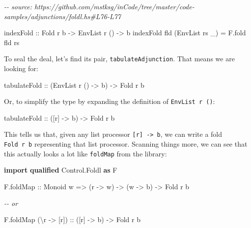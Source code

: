 \documentclass[]{article}
\newenvironment{Shaded}{}{}
\newcommand{\CommentTok}[1]{\textcolor[rgb]{0.38,0.63,0.69}{\textit{#1}}}
\newcommand{\DataTypeTok}[1]{\textcolor[rgb]{0.56,0.13,0.00}{#1}}
\newcommand{\KeywordTok}[1]{\textcolor[rgb]{0.00,0.44,0.13}{\textbf{#1}}}
\newcommand{\NormalTok}[1]{#1}
\newcommand{\OtherTok}[1]{\textcolor[rgb]{0.00,0.44,0.13}{#1}}
\begin{document}
\begin{Shaded}
\begin{Highlighting}[]
\CommentTok{{-}{-} source: https://github.com/mstksg/inCode/tree/master/code{-}samples/adjunctions/foldl.hs\#L76{-}L77}

\OtherTok{indexFold ::} \DataTypeTok{Fold}\NormalTok{ r b }\OtherTok{{-}>} \DataTypeTok{EnvList}\NormalTok{ r () }\OtherTok{{-}>}\NormalTok{ b}
\NormalTok{indexFold fld (}\DataTypeTok{EnvList}\NormalTok{ rs \_) }\OtherTok{=}\NormalTok{ F.fold fld rs}
\end{Highlighting}
\end{Shaded}

To seal the deal, let's find its pair, \texttt{tabulateAdjunction}. That means
we are looking for:

\begin{Shaded}
\begin{Highlighting}[]
\OtherTok{tabulateFold ::}\NormalTok{ (}\DataTypeTok{EnvList}\NormalTok{ r () }\OtherTok{{-}>}\NormalTok{ b) }\OtherTok{{-}>} \DataTypeTok{Fold}\NormalTok{ r b}
\end{Highlighting}
\end{Shaded}

Or, to simplify the type by expanding the definition of \texttt{EnvList\ r\ ()}:

\begin{Shaded}
\begin{Highlighting}[]
\OtherTok{tabulateFold ::}\NormalTok{ ([r] }\OtherTok{{-}>}\NormalTok{ b) }\OtherTok{{-}>} \DataTypeTok{Fold}\NormalTok{ r b}
\end{Highlighting}
\end{Shaded}

This tells us that, given any list processor
\texttt{{[}r{]}\ -\textgreater{}\ b}, we can write a fold \texttt{Fold\ r\ b}
representing that list processor. Scanning things more, we can see that this
actually looks a lot like \texttt{foldMap} from the library:

\begin{Shaded}
\begin{Highlighting}[]
\KeywordTok{import} \KeywordTok{qualified} \DataTypeTok{Control.Foldl} \KeywordTok{as} \DataTypeTok{F}

\NormalTok{F.foldMap}
\OtherTok{    ::} \DataTypeTok{Monoid}\NormalTok{ w}
    \OtherTok{=>}\NormalTok{ (r }\OtherTok{{-}>}\NormalTok{ w)}
    \OtherTok{{-}>}\NormalTok{ (w }\OtherTok{{-}>}\NormalTok{ b)}
    \OtherTok{{-}>} \DataTypeTok{Fold}\NormalTok{ r b}

\CommentTok{{-}{-} or}

\NormalTok{F.foldMap (\textbackslash{}r }\OtherTok{{-}>}\NormalTok{ [r])}
\OtherTok{    ::}\NormalTok{ ([r] }\OtherTok{{-}>}\NormalTok{ b)}
    \OtherTok{{-}>} \DataTypeTok{Fold}\NormalTok{ r b}
\end{Highlighting}
\end{Shaded}
\end{document}
